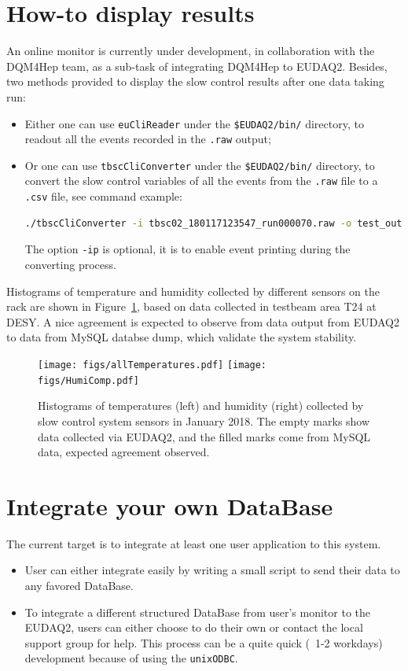 \documentclass[a4paper,12pt]{scrartcl}
\begin{document}
\section{How-to display results}
An online monitor is currently under development, in collaboration with the DQM4Hep team, as a sub-task of integrating DQM4Hep to EUDAQ2.
Besides, two methods provided to display the slow control results after one data taking run:
\begin{itemize}
  \item Either one can use \verb|euCliReader| under the \verb|$EUDAQ2/bin/| directory, to readout all the events recorded in the \verb|.raw| output;
  \item Or one can use \verb|tbscCliConverter| under the \verb|$EUDAQ2/bin/| directory, to convert the slow control variables of all the events from the \verb|.raw| file to a \verb|.csv| file, see command example:
  \begin{lstlisting}[language=bash]
./tbscCliConverter -i tbsc02_180117123547_run000070.raw -o test_out.csv -ip
\end{lstlisting}
  The option \verb|-ip| is optional, it is to enable event printing during the converting process.
\end{itemize}

Histograms of temperature and humidity collected by different sensors on the rack are shown in Figure~\ref{fig:res-eg1}, based on data collected in testbeam area T24 at DESY. A nice agreement is expected to observe from data output from EUDAQ2 to data from MySQL databse dump, which validate the system stability.

\begin{figure}[!ht]
\centering
\texttt{[image: figs/allTemperatures.pdf]}%
\texttt{[image: figs/HumiComp.pdf]}
\caption{Histograms of temperatures (left) and humidity (right) collected by slow control system sensors in January 2018. The empty marks show data collected via EUDAQ2, and the filled marks come from MySQL data, expected agreement observed.}
\label{fig:res-eg1}
\end{figure}


\section{Integrate your own DataBase}
The current target is to integrate at least one user application to this system.
\begin{itemize}
  \item User can either integrate easily by writing a small script to send their data to any favored DataBase.
  \item To integrate a different structured DataBase from user's monitor to the EUDAQ2, users can either choose to do their own or contact the local support group for help. This process can be a quite quick (~1-2 workdays) development because of using the \texttt{unixODBC}.
\end{itemize}
\end{document}
